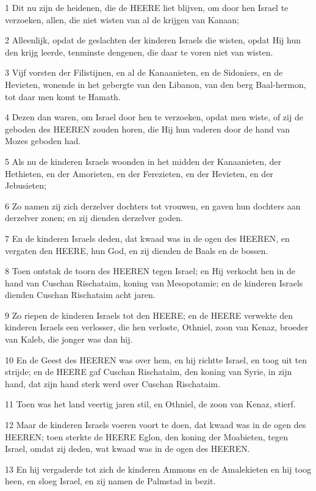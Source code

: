 \par 1 Dit nu zijn de heidenen, die de HEERE liet blijven, om door hen Israel te verzoeken, allen, die niet wisten van al de krijgen van Kanaan;
\par 2 Alleenlijk, opdat de geslachten der kinderen Israels die wisten, opdat Hij hun den krijg leerde, tenminste dengenen, die daar te voren niet van wisten.
\par 3 Vijf vorsten der Filistijnen, en al de Kanaanieten, en de Sidoniers, en de Hevieten, wonende in het gebergte van den Libanon, van den berg Baal-hermon, tot daar men komt te Hamath.
\par 4 Dezen dan waren, om Israel door hen te verzoeken, opdat men wiste, of zij de geboden des HEEREN zouden horen, die Hij hun vaderen door de hand van Mozes geboden had.
\par 5 Als nu de kinderen Israels woonden in het midden der Kanaanieten, der Hethieten, en der Amorieten, en der Ferezieten, en der Hevieten, en der Jebusieten;
\par 6 Zo namen zij zich derzelver dochters tot vrouwen, en gaven hun dochters aan derzelver zonen; en zij dienden derzelver goden.
\par 7 En de kinderen Israels deden, dat kwaad was in de ogen des HEEREN, en vergaten den HEERE, hun God, en zij dienden de Baals en de bossen.
\par 8 Toen ontstak de toorn des HEEREN tegen Israel; en Hij verkocht hen in de hand van Cuschan Rischataim, koning van Mesopotamie; en de kinderen Israels dienden Cuschan Rischataim acht jaren.
\par 9 Zo riepen de kinderen Israels tot den HEERE; en de HEERE verwekte den kinderen Israels een verlosser, die hen verloste, Othniel, zoon van Kenaz, broeder van Kaleb, die jonger was dan hij.
\par 10 En de Geest des HEEREN was over hem, en hij richtte Israel, en toog uit ten strijde; en de HEERE gaf Cuschan Rischataim, den koning van Syrie, in zijn hand, dat zijn hand sterk werd over Cuschan Rischataim.
\par 11 Toen was het land veertig jaren stil, en Othniel, de zoon van Kenaz, stierf.
\par 12 Maar de kinderen Israels voeren voort te doen, dat kwaad was in de ogen des HEEREN; toen sterkte de HEERE Eglon, den koning der Moabieten, tegen Israel, omdat zij deden, wat kwaad was in de ogen des HEEREN.
\par 13 En hij vergaderde tot zich de kinderen Ammons en de Amalekieten en hij toog heen, en sloeg Israel, en zij namen de Palmstad in bezit.
